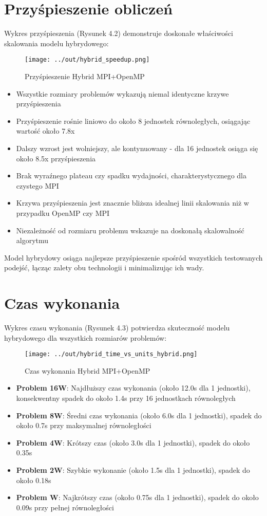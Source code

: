\documentclass[12pt,a4paper]{report}
\begin{document}
\section{Przyśpieszenie obliczeń}
Wykres przyśpieszenia (Rysunek 4.2) demonstruje doskonałe właściwości skalowania modelu hybrydowego:
\begin{figure}[h]
    \centering
    \texttt{[image: ../out/hybrid\_speedup.png]}
    \caption{Przyśpieszenie Hybrid MPI+OpenMP}
    \label{fig:hybrid_speedup}
\end{figure}
\begin{itemize}
    \item Wszystkie rozmiary problemów wykazują niemal identyczne krzywe przyśpieszenia
    \item Przyśpieszenie rośnie liniowo do około 8 jednostek równoległych, osiągając wartość około 7.8x
    \item Dalszy wzrost jest wolniejszy, ale kontynuowany - dla 16 jednostek osiąga się około 8.5x przyśpieszenia
    \item Brak wyraźnego plateau czy spadku wydajności, charakterystycznego dla czystego MPI
    \item Krzywa przyśpieszenia jest znacznie bliższa idealnej linii skalowania niż w przypadku OpenMP czy MPI
    \item Niezależność od rozmiaru problemu wskazuje na doskonałą skalowalność algorytmu
\end{itemize}

Model hybrydowy osiąga najlepsze przyśpieszenie spośród wszystkich testowanych podejść, łącząc zalety obu technologii i minimalizując ich wady.

\section{Czas wykonania}
Wykres czasu wykonania (Rysunek 4.3) potwierdza skuteczność modelu hybrydowego dla wszystkich rozmiarów problemów:
\begin{figure}[h]
    \centering
    \texttt{[image: ../out/hybrid\_time\_vs\_units\_hybrid.png]}
    \caption{Czas wykonania Hybrid MPI+OpenMP}
    \label{fig:hybrid_time}
\end{figure}
\begin{itemize}
    \item \textbf{Problem 16W}: Najdłuższy czas wykonania (około 12.0s dla 1 jednostki), konsekwentny spadek do około 1.4s przy 16 jednostkach równoległych
    \item \textbf{Problem 8W}: Średni czas wykonania (około 6.0s dla 1 jednostki), spadek do około 0.7s przy maksymalnej równoległości
    \item \textbf{Problem 4W}: Krótszy czas (około 3.0s dla 1 jednostki), spadek do około 0.35s
    \item \textbf{Problem 2W}: Szybkie wykonanie (około 1.5s dla 1 jednostki), spadek do około 0.18s
    \item \textbf{Problem W}: Najkrótszy czas (około 0.75s dla 1 jednostki), spadek do około 0.09s przy pełnej równoległości
\end{itemize}
\end{document}
